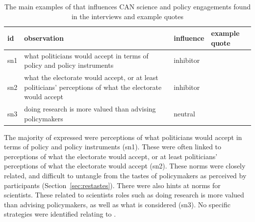 \subsubsection{\ismsn}\label{sec:resnorms}

\begin{table}[!ht]
\footnotesize
\caption{The main examples of \ismsn{} that influences CAN science and policy engagements found in the interviews and example quotes}\label{tab:resnorms}
\begin{tabular}{L{.06\linewidth}L{.3\linewidth}L{.12\linewidth}L{.52\linewidth}} \hline
\textbf{id} & \textbf{observation} & \textbf{influence} & \textbf{example quote} \\ \hline \hline 
sn1 & what politicians would accept in terms of policy and policy instruments & inhibitor &  \\[5mm]
sn2 & what the electorate would accept, or at least politicians' perceptions of what the electorate would accept & inhibitor &  \\[5mm]
sn3 & doing research is more valued than advising policymakers & neutral &  \\[5mm]
 \hline
\end{tabular}
\end{table}

The majority of \ismsn{} expressed were perceptions of what politicians would accept in terms of policy and policy instruments (sn1). These were often linked to perceptions of what the electorate would accept, or at least politicians' perceptions of what the electorate would accept (sn2). These norms were closely related, and difficult to untangle from the tastes of policymakers as perceived by participants (Section~\ref{sec:restastes}). There were also hints at norms for scientists. These related to scientists roles such as doing research is more valued than advising policymakers, as well as what is considered  (sn3). No specific strategies were identified relating to \ismsn.

